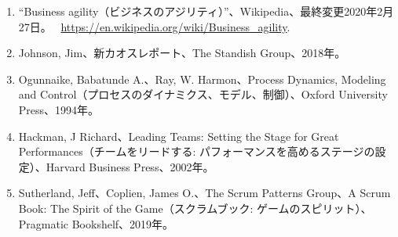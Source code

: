 \documentclass[12pt,a4paper,parskip=full]{scrartcl}
\begin{document}
\begin{enumerate}
\itemsep1pt\parskip0pt

\item
  “Business agility（ビジネスのアジリティ）”、Wikipedia、最終変更2020年2月27日。
  \newline ~\href{https://en.wikipedia.org/wiki/Business_agility}{https://en.wikipedia.org/wiki/Business\_agility}.
\item
  Johnson, Jim、新カオスレポート、The Standish Group、2018年。
\item
  Ogunnaike, Babatunde A.、Ray, W. Harmon、Process Dynamics, Modeling and Control（プロセスのダイナミクス、モデル、制御）、Oxford University Press、1994年。
\item
  Hackman, J Richard、Leading Teams: Setting the Stage for Great Performances（チームをリードする: パフォーマンスを高めるステージの設定）、Harvard Business Press、2002年。
\item
  Sutherland, Jeff、Coplien, James O.、The Scrum Patterns Group、A Scrum Book: The Spirit of the Game（スクラムブック: ゲームのスピリット）、Pragmatic Bookshelf、2019年。

\end{enumerate}
\end{document}

